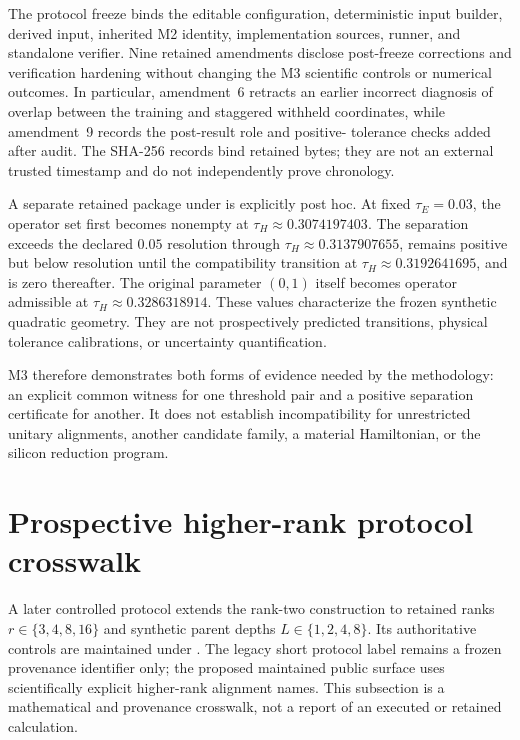 The protocol freeze binds the editable configuration, deterministic input
builder, derived input, inherited M2 identity, implementation sources, runner,
and standalone verifier. Nine retained amendments disclose post-freeze
corrections and verification hardening without changing the M3 scientific
controls or numerical outcomes. In particular, amendment~6 retracts an earlier
incorrect diagnosis of overlap between the training and staggered withheld
coordinates, while amendment~9 records the post-result role and positive-
tolerance checks added after audit. The SHA-256 records bind retained bytes;
they are not an external trusted timestamp and do not independently prove
chronology.

A separate retained package under
 is explicitly post
hoc. At fixed $\tau_E=0.03$, the operator set first becomes nonempty at
$\tau_H\approx0.3074197403$. The separation exceeds the declared $0.05$
resolution through $\tau_H\approx0.3137907655$, remains positive but below
resolution until the compatibility transition at
$\tau_H\approx0.3192641695$, and is zero thereafter. The original parameter
$(0,1)$ itself becomes operator admissible at
$\tau_H\approx0.3286318914$. These values characterize the frozen synthetic
quadratic geometry. They are not prospectively predicted transitions, physical
tolerance calibrations, or uncertainty quantification.

M3 therefore demonstrates both forms of evidence needed by the methodology:
an explicit common witness for one threshold pair and a positive separation
certificate for another. It does not establish incompatibility for unrestricted
unitary alignments, another candidate family, a material Hamiltonian, or the
silicon reduction program.

\section{Prospective higher-rank protocol crosswalk}
\label{sec:appendix-g-higher-rank-crosswalk}

A later controlled protocol extends the rank-two construction to retained ranks
$r\in\{3,4,8,16\}$ and synthetic parent depths
$L\in\{1,2,4,8\}$.  Its authoritative controls are maintained under
.
The legacy short protocol label remains a frozen provenance identifier only; the proposed
maintained public surface uses scientifically explicit higher-rank alignment names.
This subsection is a mathematical and provenance crosswalk, not a report of an
executed or retained calculation.

